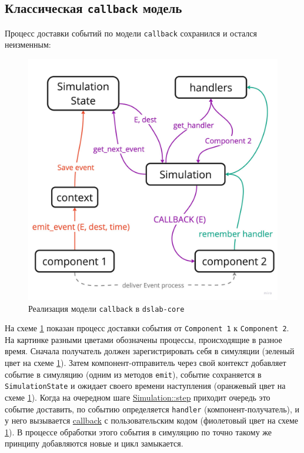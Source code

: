 \subsection{Классическая \texttt{callback} модель}
Процесс доставки событий по модели \texttt{callback} сохранился и остался неизменным: 
\nopagebreak
\begin{figure}[H]
    \centering
    \includegraphics[width=0.7\linewidth]{images/dslab-core-callback-new.pdf}
    \caption{Реализация модели \texttt{callback} в \texttt{dslab-core}}
    \label{dslab_inner}
\end{figure}

На схеме \ref{dslab_inner} показан процесс доставки события от \texttt{Component~1} к \texttt{Component~2}. На картинке разными цветами обозначены процессы, происходящие в разное время. Сначала получатель должен зарегистрировать себя в симуляции (зеленый цвет на схеме \ref{dslab_inner}). Затем компонент-отправитель через свой контекст добавляет событие в симуляцию (одним из методов \texttt{emit}), событие сохраняется в \texttt{SimulationState} и ожидает своего времени наступления (оранжевый цвет на схеме \ref{dslab_inner}). Когда на очередном шаге \hyperref[Simulation::step]{Simulation::step} приходит очередь это событие доставить, по событию определяется \texttt{handler} (компонент-получатель), и у него вызывается \hyperref[fnon]{callback} с пользовательским кодом (фиолетовый цвет на схеме \ref{dslab_inner}). В процессе обработки этого события в симуляцию по точно такому же принципу добавляются новые и цикл замыкается.


